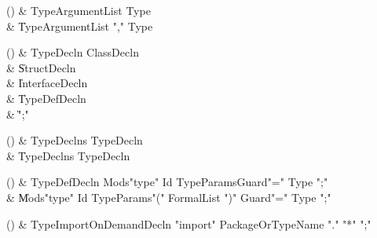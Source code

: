 \begin{bbgrammarappendix}{3.4in}

() & TypeArgumentList \label{prod:TypeArgumentList}  \: Type  \\

 &    \| TypeArgumentList \xcd"," Type \\

\end{bbgrammarappendix}

\begin{bbgrammarappendix}{4.1in}

() & TypeDecln \label{prod:TypeDecln}  \: ClassDecln  \\

 &    \| StructDecln \\
 &    \| InterfaceDecln \\
 &    \| TypeDefDecln \\
 &    \| \xcd";" \\

\end{bbgrammarappendix}

\begin{bbgrammarappendix}{4.0in}

() & TypeDeclns \label{prod:TypeDeclns}  \: TypeDecln  \\

 &    \| TypeDeclns TypeDecln \\

\end{bbgrammarappendix}

\begin{bbgrammarappendix}{3.8in}

() & TypeDefDecln \label{prod:TypeDefDecln}  \: Mods\opt \xcd"type" Id TypeParams\opt Guard\opt \xcd"=" Type \xcd";"  \\

 &    \| Mods\opt \xcd"type" Id TypeParams\opt \xcd"(" FormalList \xcd")" Guard\opt \xcd"=" Type \xcd";" \\

\end{bbgrammarappendix}

\begin{bbgrammarappendix}{2.7in}

() & TypeImportOnDemandDecln \label{prod:TypeImportOnDemandDecln}  \: \xcd"import" PackageOrTypeName \xcd"." \xcd"*" \xcd";"  \\


\end{bbgrammarappendix}

